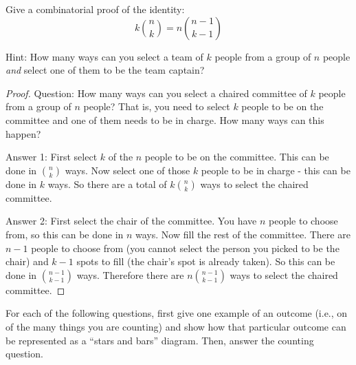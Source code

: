 \begin{questions}
 \question[6] Give a combinatorial proof of the identity:
 \[k{n\choose k} = n{n-1 \choose k-1}\]

 Hint: How many ways can you select a team of $k$ people from a group of $n$ people \emph{and} select one of them to be the team captain?
   \begin{solution}
     \begin{proof}
       Question: How many ways can you select a chaired committee of $k$ people from a group of $n$ people?  That is, you need to select $k$ people to be on the committee and one of them needs to be in charge.  How many ways can this happen?

       Answer 1: First select $k$ of the $n$ people to be on the committee.  This can be done in ${n \choose k}$ ways.  Now select one of those $k$ people to be in charge - this can be done in $k$ ways.  So there are a total of $k {n \choose k}$ ways to select the chaired committee.

       Answer 2: First select the chair of the committee.  You have $n$ people to choose from, so this can be done in $n$ ways.  Now fill the rest of the committee.  There are $n-1$ people to choose from (you cannot select the person you picked to be the chair) and $k-1$ spots to fill (the chair's spot is already taken).  So this can be done in ${n-1 \choose k-1}$ ways.  Therefore there are $n{n-1 \choose k-1}$ ways to select the chaired committee.
     \end{proof}

   \end{solution}



 	\question[6] For each of the following questions, first give one example of an outcome (i.e., on of the many things you are counting) and show how that particular outcome can be represented as a ``stars and bars'' diagram.  Then, answer the counting question.
\end{questions}
